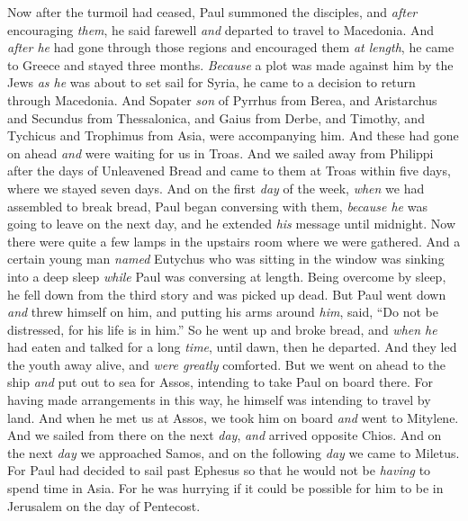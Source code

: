 \begin{biblechapter} %
 Now after the turmoil had ceased, Paul summoned the disciples, and \textit{after} encouraging \textit{them}, he said farewell \textit{and} departed to travel to Macedonia.
\verse And \textit{after he} had gone through those regions and encouraged them \textit{at length}, he came to Greece
\verse and stayed three months. \textit{Because} a plot was made against him by the Jews \textit{as he} was about to set sail for Syria, he came to a decision to return through Macedonia.
\verse And Sopater \textit{son} of Pyrrhus from Berea, and Aristarchus and Secundus from Thessalonica, and Gaius from Derbe, and Timothy, and Tychicus and Trophimus from Asia, were accompanying him.
\verse And these had gone on ahead \textit{and} were waiting for us in Troas.
\verse And we sailed away from Philippi after the days of Unleavened Bread and came to them at Troas within five days, where we stayed seven days.
 And on the first \textit{day} of the week, \textit{when} we had assembled to break bread, Paul began conversing with them, \textit{because he} was going to leave on the next day, and he extended \textit{his} message until midnight.
\verse Now there were quite a few lamps in the upstairs room where we were gathered.
\verse And a certain young man \textit{named} Eutychus who was sitting in the window was sinking into a deep sleep \textit{while} Paul was conversing at length. Being overcome by sleep, he fell down from the third story and was picked up dead.
\verse But Paul went down \textit{and} threw himself on him, and putting his arms around \textit{him}, said, “Do not be distressed, for his life is in him.”
\verse So he went up and broke bread, and \textit{when he} had eaten and talked for a long \textit{time}, until dawn, then he departed.
\verse And they led the youth away alive, and \textit{were greatly} comforted.
 But we went on ahead to the ship \textit{and} put out to sea for Assos, intending to take Paul on board there. For having made arrangements in this way, he himself was intending to travel by land.
\verse And when he met us at Assos, we took him on board \textit{and} went to Mitylene.
\verse And we sailed from there on the next \textit{day}, \textit{and} arrived opposite Chios. And on the next \textit{day} we approached Samos, and on the following \textit{day} we came to Miletus.
\verse For Paul had decided to sail past Ephesus so that he would not be \textit{having} to spend time in Asia. For he was hurrying if it could be possible for him to be in Jerusalem on the day of Pentecost.

\end{biblechapter}
